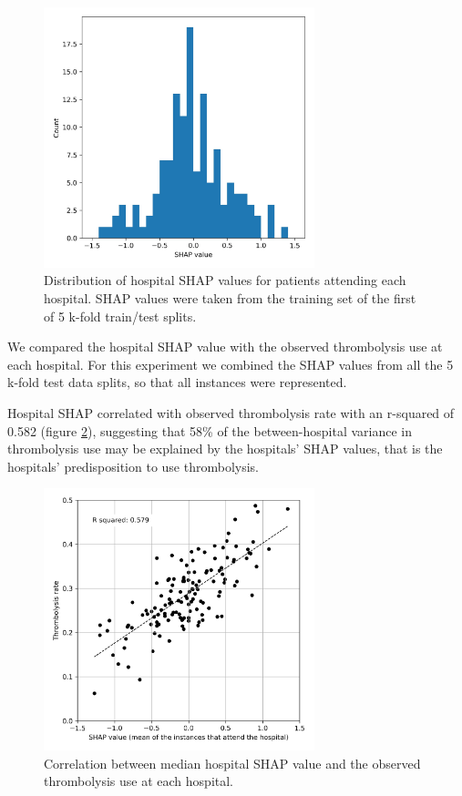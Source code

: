 \begin{figure}
\centering
\includegraphics[width=0.7\textwidth]{./images/03_xgb_10_features_hosp_shap_hist}
\caption{Distribution of hospital SHAP values for patients attending each hospital. SHAP values were taken from the training set of the first of 5 k-fold train/test splits.}
\label{fig:shap_histogram}
\end{figure}

We compared the hospital SHAP value with the observed thrombolysis use at each hospital. For this experiment we combined the SHAP values from all the 5 k-fold test data splits, so that all instances were represented.

Hospital SHAP correlated with observed thrombolysis rate with an r-squared of 0.582 (figure \ref{fig:shap_correlation_1}), suggesting that 58\% of the between-hospital variance in thrombolysis use may be explained by the hospitals' SHAP values, that is the hospitals' predisposition to use thrombolysis.

\begin{figure}
\centering
\includegraphics[width=0.7\textwidth]{./images/03c_xgb_10_features_attended_hosp_shap_value}
\caption{Correlation between median hospital SHAP value and the observed thrombolysis use at each hospital.}
\label{fig:shap_correlation_1}
\end{figure}

